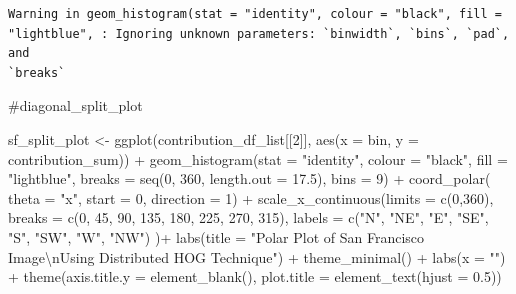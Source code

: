 \documentclass[
  letterpaper,
]{report}
\newenvironment{Shaded}{\begin{snugshade}}{\end{snugshade}}
\newcommand{\AttributeTok}[1]{\textcolor[rgb]{0.40,0.45,0.13}{#1}}
\newcommand{\CommentTok}[1]{\textcolor[rgb]{0.37,0.37,0.37}{#1}}
\newcommand{\DecValTok}[1]{\textcolor[rgb]{0.68,0.00,0.00}{#1}}
\newcommand{\FloatTok}[1]{\textcolor[rgb]{0.68,0.00,0.00}{#1}}
\newcommand{\FunctionTok}[1]{\textcolor[rgb]{0.28,0.35,0.67}{#1}}
\newcommand{\NormalTok}[1]{\textcolor[rgb]{0.00,0.23,0.31}{#1}}
\newcommand{\OtherTok}[1]{\textcolor[rgb]{0.00,0.23,0.31}{#1}}
\newcommand{\SpecialCharTok}[1]{\textcolor[rgb]{0.37,0.37,0.37}{#1}}
\newcommand{\StringTok}[1]{\textcolor[rgb]{0.13,0.47,0.30}{#1}}
\begin{document}
\begin{verbatim}
Warning in geom_histogram(stat = "identity", colour = "black", fill =
"lightblue", : Ignoring unknown parameters: `binwidth`, `bins`, `pad`, and
`breaks`
\end{verbatim}

\begin{Shaded}
\begin{Highlighting}[]
\CommentTok{\#diagonal\_split\_plot}
\end{Highlighting}
\end{Shaded}

\begin{Shaded}
\begin{Highlighting}[]
\NormalTok{sf\_split\_plot }\OtherTok{\textless{}{-}}
  \FunctionTok{ggplot}\NormalTok{(contribution\_df\_list[[}\DecValTok{2}\NormalTok{]], }
         \FunctionTok{aes}\NormalTok{(}\AttributeTok{x =}\NormalTok{ bin, }\AttributeTok{y =}\NormalTok{ contribution\_sum)) }\SpecialCharTok{+}
  \FunctionTok{geom\_histogram}\NormalTok{(}\AttributeTok{stat =} \StringTok{"identity"}\NormalTok{,}
                 \AttributeTok{colour =} \StringTok{"black"}\NormalTok{, }
                 \AttributeTok{fill =} \StringTok{"lightblue"}\NormalTok{, }
                 \AttributeTok{breaks =} \FunctionTok{seq}\NormalTok{(}\DecValTok{0}\NormalTok{, }\DecValTok{360}\NormalTok{, }\AttributeTok{length.out =} \FloatTok{17.5}\NormalTok{),}
                 \AttributeTok{bins =} \DecValTok{9}\NormalTok{) }\SpecialCharTok{+}
  \FunctionTok{coord\_polar}\NormalTok{(}
    \AttributeTok{theta =} \StringTok{"x"}\NormalTok{, }
    \AttributeTok{start =} \DecValTok{0}\NormalTok{, }
    \AttributeTok{direction =} \DecValTok{1}\NormalTok{) }\SpecialCharTok{+}
  \FunctionTok{scale\_x\_continuous}\NormalTok{(}\AttributeTok{limits =} \FunctionTok{c}\NormalTok{(}\DecValTok{0}\NormalTok{,}\DecValTok{360}\NormalTok{),}
    \AttributeTok{breaks =} \FunctionTok{c}\NormalTok{(}\DecValTok{0}\NormalTok{, }\DecValTok{45}\NormalTok{, }\DecValTok{90}\NormalTok{, }\DecValTok{135}\NormalTok{, }\DecValTok{180}\NormalTok{, }\DecValTok{225}\NormalTok{, }\DecValTok{270}\NormalTok{, }\DecValTok{315}\NormalTok{), }
    \AttributeTok{labels =} \FunctionTok{c}\NormalTok{(}\StringTok{"N"}\NormalTok{, }\StringTok{"NE"}\NormalTok{, }\StringTok{"E"}\NormalTok{, }\StringTok{"SE"}\NormalTok{, }\StringTok{"S"}\NormalTok{, }\StringTok{"SW"}\NormalTok{, }\StringTok{"W"}\NormalTok{, }\StringTok{"NW"}\NormalTok{)}
\NormalTok{  )}\SpecialCharTok{+}
  \FunctionTok{labs}\NormalTok{(}\AttributeTok{title =} \StringTok{"Polar Plot of San Francisco Image}\SpecialCharTok{\textbackslash{}n}\StringTok{Using Distributed HOG Technique"}\NormalTok{) }\SpecialCharTok{+}
  \FunctionTok{theme\_minimal}\NormalTok{() }\SpecialCharTok{+}
  \FunctionTok{labs}\NormalTok{(}\AttributeTok{x =} \StringTok{""}\NormalTok{) }\SpecialCharTok{+}
  \FunctionTok{theme}\NormalTok{(}\AttributeTok{axis.title.y =} \FunctionTok{element\_blank}\NormalTok{(),}
        \AttributeTok{plot.title =} \FunctionTok{element\_text}\NormalTok{(}\AttributeTok{hjust =} \FloatTok{0.5}\NormalTok{))}
\end{Highlighting}
\end{Shaded}
\end{document}
